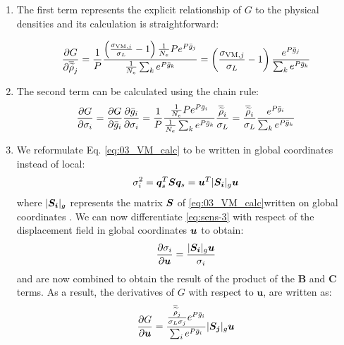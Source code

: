 \begin{enumerate}[label=\Alph* --]
    \item The first term represents the explicit relationship of $G$ to the physical densities and its calculation is straightforward: 

    \begin{equation} \label{eq:sens-2-1}
        \frac{\partial G}{\partial \overline{\widetilde{\rho}}_j} = \frac{1}{P} \frac{\left(\frac{ \sigma_{\text{VM},j}}{\sigma_L}-1 \right)\frac{1}{N_e} P e^{{P}\bar{g}_j}}{\frac{1}{N_e} \sum_k e^{{P}\bar{g}_k}} = \left(\frac{ \sigma_{\text{VM},j}}{\sigma_L}-1 \right) \frac{e^{{P}\bar{g}_j}}{\sum_k e^{{P}\bar{g}_k}}
    \end{equation}
    
    \item The second term can be calculated using the chain rule:
    \begin{equation}
        \label{eq:sens-2-2}
        \frac{\partial G}{\partial\sigma_i} = \frac{\partial G}{\partial\bar{g}_i} \frac{\partial\bar{g}_i}{\partial\sigma_i} = \frac{1}{P} \frac{\frac{1}{N_e} P e^{{P}\bar{g}_i}}{\frac{1}{N_e} \sum_k e^{{P}\bar{g}_k}} \frac{\overline{\widetilde{\rho}}_i}{\sigma_L} = \frac{\overline{\widetilde{\rho}}_i}{\sigma_L} \frac{e^{{P}\bar{g}_i}}{\sum_k e^{{P}\bar{g}_k}}
    \end{equation}
    
    \item We reformulate Eq. \ref{eq:03_VM_calc} to be written in global coordinates instead of local:
    \begin{equation}
        \label{eq:sens-3}
        \sigma_i^2 = \bm{q}_s^T\bm{S}\bm{q}_s = \bm{u}^T |\bm{S_i}|_g \bm{u}
    \end{equation}  
    where $|\bm{S_i}|_g$ represents the matrix $\bm{S}$ of \eqref{eq:03_VM_calc}written on global coordinates . We can now differentiate \eqref{eq:sens-3} with respect of the displacement field in global coordinates $\bm{u}$ to obtain:
    \begin{equation}
        \label{eq:sens-4}
        \frac{\partial\sigma_i}{\partial\bm{u}} = \frac{|\bm{S_i}|_g \bm{u}}{\sigma_i}
    \end{equation}
     and  are now combined to obtain the result of the product of the \textbf{B} and \textbf{C} terms. As a result, the derivatives of $G$ with respect to $\bm{u}$, are written as:
    \begin{equation} \label{eq:sens-4-1}
        \frac{\partial G}{\partial\bm{u}} = \frac{\frac{\overline{\widetilde{\rho}}_j}{\sigma_L\sigma_j} e^{{P}\bar{g}_i}}{\sum_i e^{{P}\bar{g}_i}} |\bm{S_j}|_g \bm{u}
    \end{equation}


\end{enumerate}
